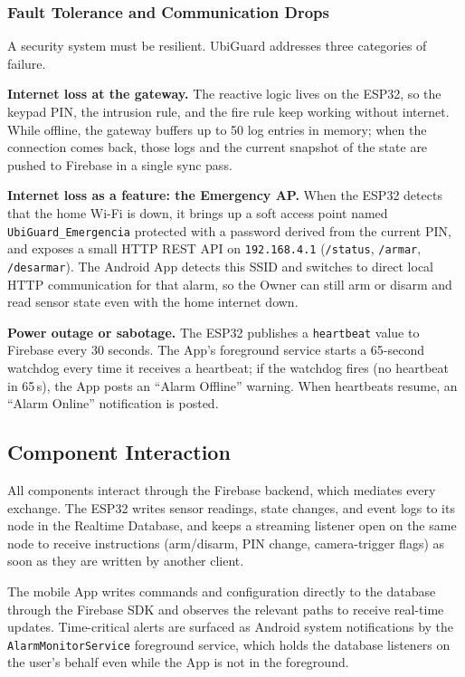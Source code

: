 \documentclass[10pt,twocolumn]{article}
\begin{document}
\subsubsection{Fault Tolerance and Communication Drops}
A security system must be resilient. UbiGuard addresses three categories of failure.

\textbf{Internet loss at the gateway.} The reactive logic lives on the ESP32, so the keypad PIN, the intrusion rule, and the fire rule keep working without internet. While offline, the gateway buffers up to 50 log entries in memory; when the connection comes back, those logs and the current snapshot of the state are pushed to Firebase in a single sync pass.

\textbf{Internet loss as a feature: the Emergency AP.} When the ESP32 detects that the home Wi-Fi is down, it brings up a soft access point named \texttt{UbiGuard\_Emergencia} protected with a password derived from the current PIN, and exposes a small HTTP REST API on \texttt{192.168.4.1} (\texttt{/status}, \texttt{/armar}, \texttt{/desarmar}). The Android App detects this SSID and switches to direct local HTTP communication for that alarm, so the Owner can still arm or disarm and read sensor state even with the home internet down.

\textbf{Power outage or sabotage.} The ESP32 publishes a \texttt{heartbeat} value to Firebase every 30 seconds. The App's foreground service starts a 65-second watchdog every time it receives a heartbeat; if the watchdog fires (no heartbeat in 65\,s), the App posts an ``Alarm Offline'' warning. When heartbeats resume, an ``Alarm Online'' notification is posted.

\subsection{Component Interaction}
All components interact through the Firebase backend, which mediates every exchange. The ESP32 writes sensor readings, state changes, and event logs to its node in the Realtime Database, and keeps a streaming listener open on the same node to receive instructions (arm/disarm, PIN change, camera-trigger flags) as soon as they are written by another client.

The mobile App writes commands and configuration directly to the database through the Firebase SDK and observes the relevant paths to receive real-time updates. Time-critical alerts are surfaced as Android system notifications by the \texttt{AlarmMonitorService} foreground service, which holds the database listeners on the user's behalf even while the App is not in the foreground.
\end{document}
